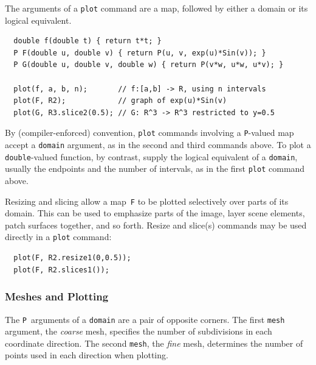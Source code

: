 \documentclass[12pt,letterpaper]{book}
\newcommand{\code}[1]{\texttt{#1}}
\newcommand{\ePiX}{\code{ePiX}}
\newcommand{\teximath}[1]{$#1$}
\newcommand{\findex}[1]{\ignorespaces}
\begin{document}
The arguments of a \code{plot} command are a map, followed by either a
domain or its logical equivalent.
\findex{plot}
\begin{verbatim}
  double f(double t) { return t*t; }
  P F(double u, double v) { return P(u, v, exp(u)*Sin(v)); }
  P G(double u, double v, double w) { return P(v*w, u*w, u*v); }

  plot(f, a, b, n);       // f:[a,b] -> R, using n intervals
  plot(F, R2);            // graph of exp(u)*Sin(v)
  plot(G, R3.slice2(0.5); // G: R^3 -> R^3 restricted to y=0.5
\end{verbatim}
By (compiler-enforced) convention, \code{plot} commands involving a
\code{P}-valued map accept a \code{domain} argument, as in the second
and third commands above. To plot a \code{double}-valued function, by
contrast, supply the logical equivalent of a \code{domain}, usually
the endpoints and the number of intervals, as in the first \code{plot}
command above.

Resizing and slicing allow a map~\code{F} to be plotted selectively
over parts of its domain. This can be used to emphasize parts of the
image, layer scene elements, patch surfaces together, and so forth.
Resize and slice(s) commands may be used directly in a \code{plot}
command:
\findex{plot}
\begin{verbatim}
  plot(F, R2.resize1(0,0.5));
  plot(F, R2.slices1());
\end{verbatim}


\subsubsection*{Meshes and Plotting}

The \code{P}~arguments of a \code{domain} are a pair of opposite
corners. The first \code{mesh} argument, the \emph{coarse} mesh,
specifies the number of subdivisions in each coordinate direction.
The second \code{mesh}, the \emph{fine} mesh, determines the number of
points used in each direction when plotting.

\end{document}
